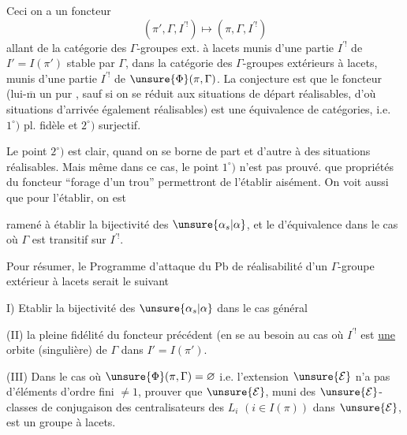 
Ceci   on a  un foncteur
\[
(\pi',\Gamma,I^{\prime !})\longmapsto(\pi,\Gamma,I^{\prime !})
\]
allant de la catégorie des $\Gamma$-groupes ext. à lacets
 munis d'une partie $I^{\prime !}$ de $I'=I(\pi')$ stable
par $\Gamma$, dans la catégorie des $\Gamma$-groupes extérieurs à lacets, munis d'une partie $I^{\prime !}$ de
$\unsure{\Phi}(\pi,\Gamma)$. La conjecture est que le foncteur
(lui-$\overline{\mathrm m}$ un pur , sauf si on se réduit aux situations de départ réalisables, d'où situations d'arrivée également réalisables) est une équivalence de catégories, i.e. $1^\circ)$ pl. fidèle et $2^\circ)$  surjectif. 

Le point $2^\circ)$ est clair, quand on se borne de part et d'autre à des situations réalisables. Mais même dans ce cas, le point $1^\circ)$ n'est pas prouvé.
  que
propriétés du foncteur ``forage d'un trou'' permettront de l'établir aisément. On voit aussi que pour l'établir, on est


ramené à établir la bijectivité des $\unsure{\alpha_s|\alpha}$, et le  d'équivalence dans le cas où $\Gamma$ est transitif sur $I^{\prime !}$.

Pour résumer, le Programme d'attaque du Pb de réalisabilité d'un $\Gamma$-groupe extérieur à lacets serait le suivant

I) Etablir la bijectivité des $\unsure{\alpha_s|\alpha}$ dans le cas général

(II)  la pleine fidélité du foncteur précédent (en se  au besoin au cas où $I^{\prime !}$ est \uline{une} orbite (singulière) de $\Gamma$ dans $I'=I(\pi')$.

(III) Dans le cas où $\unsure{\Phi}(\pi,\Gamma)=\varnothing$ i.e. l'extension $\unsure{\mathcal E}$ n'a pas d'éléments d'ordre fini $\ne1$, prouver que $\unsure{\mathcal E}$, muni  des $\unsure{\mathcal E}$-classes de conjugaison des centralisateurs des $L_i$ $(i\in I(\pi))$ dans $\unsure{\mathcal E}$, est un groupe à lacets.


